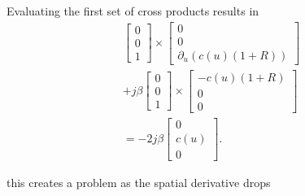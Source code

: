 Evaluating the first set of cross products results in 
\begin{multline}
    \begin{bmatrix}
        0 \\ 0 \\ 1
    \end{bmatrix} \times
    \begin{bmatrix}
        0 \\
        0 \\
        \partial_u(c(u)(1+R))
    \end{bmatrix} \\ +j\beta 
    \begin{bmatrix}
        0 \\ 0 \\ 1
    \end{bmatrix} \times
    \begin{bmatrix}
        -c(u)(1+R) \\
        0\\
        0
    \end{bmatrix} \\ =-2j\beta
    \begin{bmatrix}
        0 \\
        c(u)\\
        0
    \end{bmatrix}.
\end{multline}

this creates a problem as the spatial derivative drops